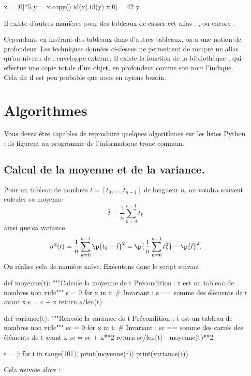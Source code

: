 \begin{pyconsole}
x = [0]*5
y = x.copy()
id(x),id(y)
x[0] = 42
y
\end{pyconsole}

Il existe d'autres manières pour des tableaux de casser cet alias : ,  ou encore .

Cependant, en insérant des tableaux dans d'autres tableaux, on a une notion de \og profondeur\fg. Les 
techniques données ci-dessus ne permettent de rompre un alias qu'au niveau de l'enveloppe externe. 
Il existe la fonction  de la bibliothèque , qui effectue une copie totale 
d'un objet, en profondeur comme son nom l'indique. Cela dit il est peu probable que nous en ayions 
besoin.

\section{Algorithmes}

Vous devez être capables de reproduire quelques algorithmes sur les listes Python : ils figurent 
au programme de l'informatique tronc commun.

\subsection{Calcul de la moyenne et de la variance.}
  Pour un tableau de nombres $t = [t_0,\dots,t_{n-1}]$ de longueur $n$, on voudra souvent calculer sa moyenne 
  \begin{equation*}
    \bar{t} = \dfrac{1}{n} \sum_{k=0}^{n-1} t_k 
  \end{equation*}
  ainsi que sa variance 
  \begin{equation*}
    \sigma^2(t) = \dfrac{1}{n} \sum_{k=0}^{n-1} \p{t_k - \bar{t}}^2 = \p{\dfrac{1}{n} \sum_{k=0}^{n-1} t_k^2} - \p{\bar{t}}^2. 
  \end{equation*}
  On réalise cela de manière naïve. Exécutons donc le script suivant

\begin{pyblock}
def moyenne(t):
    """Calcule la moyenne de t
       Précondition : t est un tableau de nombres non vide"""
    s = 0 
    for x in t:
        # Invariant : s == somme des éléments de t avant x
        s = s + x 
    return s/len(t)
    
def variance(t):
    """Renvoie la variance de t
       Précondition : t est un tableau de nombres non vide"""
    sc = 0
    for x in t:
        # Invariant : sc == somme des carrés des éléments de t avant x
        sc = sc + x**2 
    return sc/len(t) - moyenne(t)**2

t = [i for i in range(101)]
print(moyenne(t))
print(variance(t))
\end{pyblock}
Cela renvoie alors :
\begin{quote}
  \printpythontex[verb]
\end{quote}


